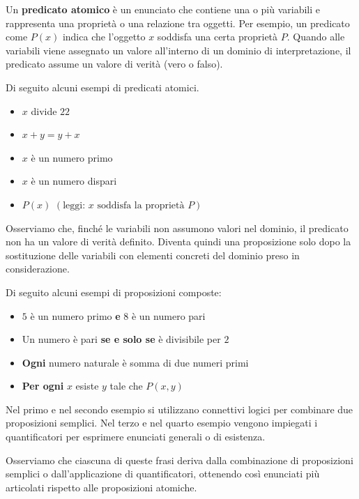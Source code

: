 {
 Un\textbf{ predicato atomico} è un enunciato che contiene una o più variabili e rappresenta una proprietà o una relazione tra oggetti. Per esempio,  un predicato come $P(x)$ indica che l'oggetto $x$   soddisfa una certa proprietà $P$.
Quando alle variabili viene assegnato un valore all'interno di un dominio di interpretazione, il predicato assume un valore di verità (vero o falso).

}
\begin{esempio}
Di seguito alcuni esempi di predicati atomici.
    \begin{itemize}
    \item $x$ divide $22$ 
    \item $x+y=y+x$
    \item $x$ è un numero primo 
    \item  $x$ è un numero dispari
    \item $P(x)$ $\left( \text{leggi: } x \text{ soddisfa la proprietà } P\right) $
\end{itemize}
Osserviamo  che, finché  le variabili non assumono valori nel dominio, il predicato non ha un valore di verità definito. Diventa quindi una proposizione solo dopo la sostituzione delle variabili con elementi concreti del dominio preso in considerazione.
\end{esempio}




\begin{esempio}
Di seguito alcuni esempi di proposizioni composte:
    \begin{itemize}
    \item $ 5$  è un numero primo \textbf{e}  $8 $ è un numero pari
    \item  Un  numero è pari \textbf{se e solo se} è divisibile per $2$
    \item \textbf{Ogni} numero naturale è somma di due numeri primi
    \item \textbf{Per ogni} $x$ esiste $y$ tale che $P \left(x,y\right)$

\end{itemize}
Nel primo e nel secondo esempio si utilizzano connettivi logici per combinare due proposizioni semplici. Nel terzo e nel quarto esempio  vengono impiegati i quantificatori per esprimere enunciati generali o di esistenza.




\noindent Osserviamo che  ciascuna di queste frasi deriva dalla combinazione di proposizioni  semplici o dall'applicazione di quantificatori, ottenendo così enunciati più articolati rispetto alle proposizioni atomiche.
\end{esempio}


